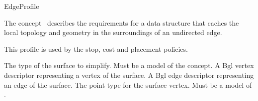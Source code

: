 
\begin{ccRefConcept}{EdgeProfile}


\ccDefinition

The concept \ccRefName\ describes the requirements for a data structure that caches the local topology and geometry in the surroundings of an undirected edge.

This profile is used by the stop, cost and placement policies.

\ccTypes
  {The type of the surface to simplify. Must be a model of the  concept.}{}
\ccGlue    
  {A {\sc Bgl} vertex descriptor representing a vertex of the surface.}
\ccGlue    
  {A {\sc Bgl} edge descriptor representing an edge of the surface.}
\ccGlue    
  {The point type for the surface vertex.  Must be a model of .}



\end{ccRefConcept}
